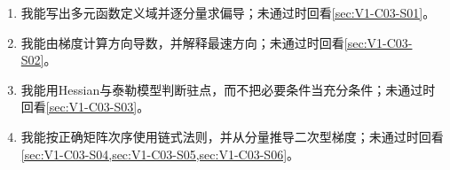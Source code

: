 \begin{SLCompactClosure}
\label{schema:V1-C03:CH-36}
\begin{selfcheckbox}\label{schema:V1-C03:CH-37}
\begin{enumerate}[leftmargin=2em]
  \item 我能写出多元函数定义域并逐分量求偏导；未通过时回看\cref{sec:V1-C03-S01}。
  \item 我能由梯度计算方向导数，并解释最速方向；未通过时回看\cref{sec:V1-C03-S02}。
  \item 我能用Hessian与泰勒模型判断驻点，而不把必要条件当充分条件；未通过时回看\cref{sec:V1-C03-S03}。
  \item 我能按正确矩阵次序使用链式法则，并从分量推导二次型梯度；未通过时回看\cref{sec:V1-C03-S04,sec:V1-C03-S05,sec:V1-C03-S06}。
\end{enumerate}
\end{selfcheckbox}
\end{SLCompactClosure}
